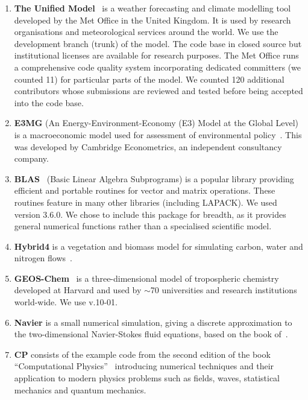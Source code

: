 \begin{enumerate}
\item \textbf{The Unified Model}~\cite{um} is a weather
  forecasting and climate modelling tool developed by the Met Office
  in the United Kingdom. It is used by research organisations and
  meteorological services around the world. We use the development
  branch (trunk) of the model. The code base in closed source but
  institutional licenses are available for research purposes. The Met
  Office runs a comprehensive code quality system incorporating
  dedicated committers (we counted 11) for particular parts of the
  model. We counted 120 additional contributors whose submissions are
  reviewed and tested before being accepted into the code base.

\item \textbf{E3MG} (An Energy-Environment-Economy (E3) Model at the Global
Level) is a macroeconomic model used for assessment of environmental
policy~\cite{RePEc:aen:journl:2006se-a12}. This was developed by
Cambridge Econometrics, an independent consultancy company.

\item \textbf{BLAS}~\cite{blas} (Basic Linear Algebra Subprograms) is
  a popular library providing efficient and portable routines for
  vector and matrix operations. These routines feature in many other
  libraries (including LAPACK). We used version 3.6.0. We chose to
  include this package for breadth, as it provides general numerical
  functions rather than a specialised scientific model.

\item \textbf{Hybrid4} is a vegetation and biomass model for
  simulating carbon, water and nitrogen flows~\cite{GBC:GBC635}.

\item \textbf{GEOS-Chem}~\cite{geos-chem} is a three-dimensional model
  of tropospheric chemistry developed at Harvard and used by $\sim$70
  universities and research institutions world-wide. We use v.10-01.

\item \textbf{Navier} is a small numerical simulation, giving a
  discrete approximation to the two-dimensional Navier-Stokes fluid
  equations, based on the book of~\citet{griebel1997numerical}.

\item \textbf{CP} consists of the example code from the second edition
  of the book ``Computational
  Physics''~\cite{giordano1997computational} introducing numerical
  techniques and their application to modern physics problems such as
  fields, waves, statistical mechanics and quantum mechanics.


\end{enumerate}
